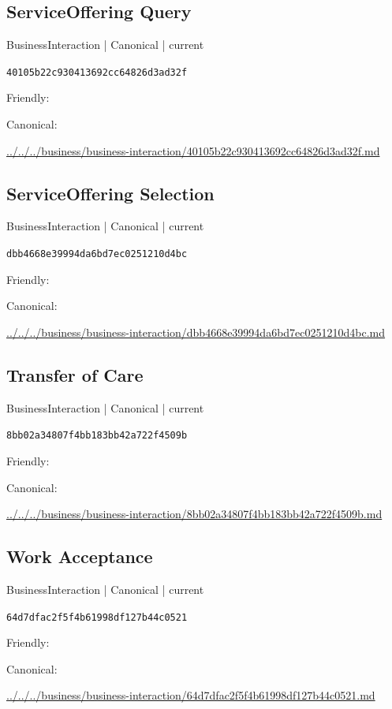 \documentclass[10pt,a4paper]{article}
\begin{document}
\subsection*{ServiceOffering Query}
{\small BusinessInteraction | Canonical | current}\par
\texttt{40105b22c930413692cc64826d3ad32f}\par
Friendly: \par
Canonical: \par
{\footnotesize\url{../../../business/business-interaction/40105b22c930413692cc64826d3ad32f.md}}\par
\subsection*{ServiceOffering Selection}
{\small BusinessInteraction | Canonical | current}\par
\texttt{dbb4668e39994da6bd7ec0251210d4bc}\par
Friendly: \par
Canonical: \par
{\footnotesize\url{../../../business/business-interaction/dbb4668e39994da6bd7ec0251210d4bc.md}}\par
\subsection*{Transfer of Care}
{\small BusinessInteraction | Canonical | current}\par
\texttt{8bb02a34807f4bb183bb42a722f4509b}\par
Friendly: \par
Canonical: \par
{\footnotesize\url{../../../business/business-interaction/8bb02a34807f4bb183bb42a722f4509b.md}}\par
\subsection*{Work Acceptance}
{\small BusinessInteraction | Canonical | current}\par
\texttt{64d7dfac2f5f4b61998df127b44c0521}\par
Friendly: \par
Canonical: \par
{\footnotesize\url{../../../business/business-interaction/64d7dfac2f5f4b61998df127b44c0521.md}}\par
\end{document}
